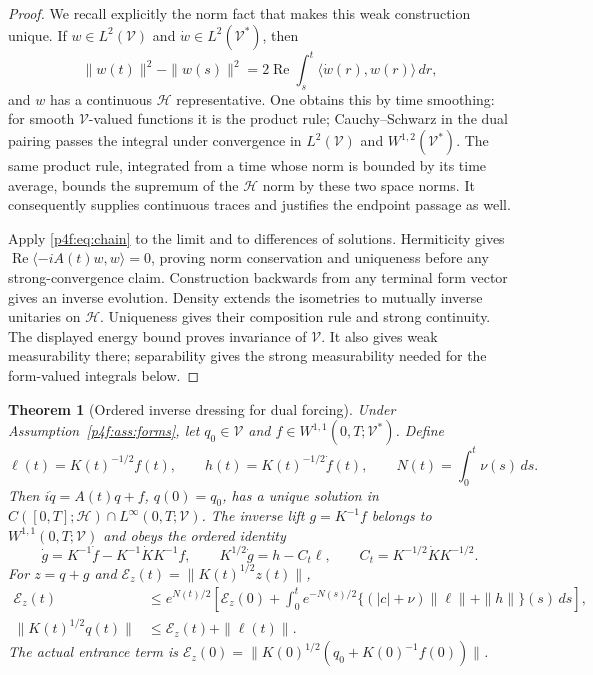 \documentclass[11pt]{article}
\numberwithin{equation}{section}
\newtheorem{theorem}{Theorem}[section]
\theoremstyle{definition}
\theoremstyle{remark}
\begin{document}
\begin{proof}
We recall explicitly the norm fact that makes this weak
construction unique. If $w\in L^2(\mathcal V)$ and
$\dot w\in L^2(\mathcal V^*)$, then
\begin{equation}\label{p4f:eq:chain}
 \|w(t)\|^2-\|w(s)\|^2
     =2\operatorname{Re}\int_s^t\langle\dot w(r),w(r)\rangle\,dr,
\end{equation}
and $w$ has a continuous $\mathcal H$ representative.
One obtains this by time smoothing: for smooth
$\mathcal V$-valued functions it is the product rule;
Cauchy--Schwarz in the dual pairing passes the integral
under convergence in $L^2(\mathcal V)$ and
$W^{1,2}(\mathcal V^*)$. The same product rule, integrated
from a time whose norm is bounded by its time average,
bounds the supremum of the $\mathcal H$ norm by these two
space norms. It consequently supplies continuous traces
and justifies the endpoint passage as well.

Apply \eqref{p4f:eq:chain} to the limit and to differences
of solutions. Hermiticity gives
$\operatorname{Re}\langle-iA(t)w,w\rangle=0$, proving norm
conservation and uniqueness before any strong-convergence
claim. Construction backwards from any terminal form
vector gives an inverse evolution. Density extends the
isometries to mutually inverse unitaries on $\mathcal H$.
Uniqueness gives their composition rule and strong
continuity. The displayed energy bound proves invariance
of $\mathcal V$. It also gives weak measurability there;
separability gives the strong measurability needed for
the form-valued integrals below.
\end{proof}

\begin{theorem}[Ordered inverse dressing for dual forcing]
\label{p4f:thm:lift}
Under Assumption~\ref{p4f:ass:forms}, let $q_0\in\mathcal V$ and
$f\in W^{1,1}(0,T;\mathcal V^*)$. Define
\[
 \ell(t)=K(t)^{-1/2}f(t),\qquad
 h(t)=K(t)^{-1/2}\dot f(t),\qquad
 N(t)=\int_0^t\nu(s)\,ds .
\]
Then $i\dot q=A(t)q+f$, $q(0)=q_0$, has a unique solution
in $C([0,T];\mathcal H)\cap L^\infty(0,T;\mathcal V)$.
The inverse lift $g=K^{-1}f$ belongs to
$W^{1,1}(0,T;\mathcal V)$ and obeys the ordered identity
\begin{equation}\label{p4f:eq:inversederivative}
 \dot g=K^{-1}\dot f-K^{-1}\dot K K^{-1}f,\qquad
 K^{1/2}\dot g=h-C_t\ell,\qquad
 C_t=K^{-1/2}\dot K K^{-1/2}.
\end{equation}
For $z=q+g$ and $\mathcal E_z(t)=\|K(t)^{1/2}z(t)\|$,
\begin{align}
 \mathcal E_z(t)
 &\le e^{N(t)/2}\left[
       \mathcal E_z(0)+
       \int_0^t e^{-N(s)/2}
          \{(|c|+\nu)\|\ell\|+\|h\|\}(s)\,ds\right],
       \label{p4f:eq:liftbound}\\
 \|K(t)^{1/2}q(t)\|&\le\mathcal E_z(t)+\|\ell(t)\|.
       \label{p4f:eq:qbound}
\end{align}
The actual entrance term is
$\mathcal E_z(0)=\|K(0)^{1/2}(q_0+K(0)^{-1}f(0))\|$.
\end{theorem}
\end{document}
